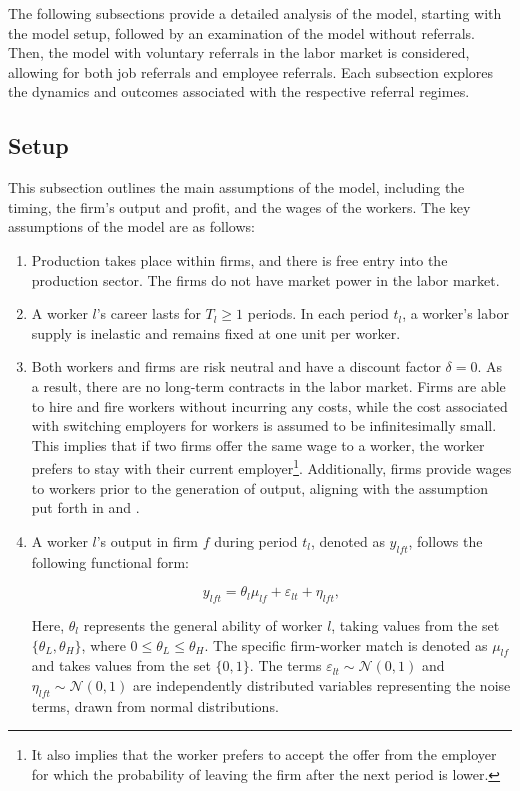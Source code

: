 \documentclass[12pt]{article}
\begin{document}
The following subsections provide a detailed analysis of the model, starting with the model setup, followed by an examination of the model without referrals. Then, the model with voluntary referrals in the labor market is considered, allowing for both job referrals and employee referrals. Each subsection explores the dynamics and outcomes associated with the respective referral regimes.

\subsection{Setup}
This subsection outlines the main assumptions of the model, including the timing, the firm's output and profit, and the wages of the workers. The key assumptions of the model are as follows:

\begin{enumerate}[label={A}{\arabic*}.]
	\item Production takes place within firms, and there is free entry into the production sector. The firms do not have market power in the labor market.
	\item A worker $l$'s career lasts for $T_l\geq 1$ periods. In each period $t_l$, a worker's labor supply is inelastic and remains fixed at one unit per worker.
	\item Both workers and firms are risk neutral and have a discount factor $\delta = 0$. As a result, there are no long-term contracts in the labor market. Firms are able to hire and fire workers without incurring any costs, while the cost associated with switching employers for workers is assumed to be infinitesimally small. This implies that if two firms offer the same wage to a worker, the worker prefers to stay with their current employer\footnote{It also implies that the worker prefers to accept the offer from the employer for which the probability of leaving the firm after the next period is lower.}. Additionally, firms provide wages to workers prior to the generation of output, aligning with the assumption put forth in \cite{gibbons1999theory} and \cite{ekinci2016employee}.
    \item A worker $l$'s output in firm $f$ during period $t_l$, denoted as $y_{lft}$, follows the following functional form:

        \begin{equation}
        y_{lft} = \theta_l \mu_{lf} + \varepsilon_{lt} + \eta_{lft},
        \end{equation}

    Here, $\theta_l$ represents the general ability of worker $l$, taking values from the set $\{\theta_L, \theta_H\}$, where $0 \leq \theta_L \leq \theta_H$. The specific firm-worker match is denoted as $\mu_{lf}$ and takes values from the set $\{0, 1\}$. The terms $\varepsilon_{lt} \sim \mathcal{N}(0, 1)$ and $\eta_{lft} \sim \mathcal{N}(0, 1)$ are independently distributed variables representing the noise terms, drawn from normal distributions.


\end{enumerate}
\end{document}
